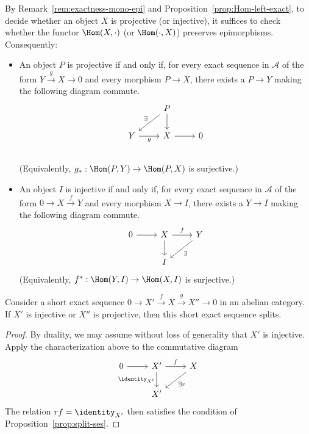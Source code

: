By Remark~\ref{rem:exactness-mono-epi} and
Proposition~\ref{prop:Hom-left-exact}, to decide whether an object $X$ is
projective (or injective), it suffices to check whether the functor
$\Hom(X,\cdot)$ (or $\Hom(\cdot,X)$) preserves epimorphisms. Consequently:
\begin{itemize}
	\item An object $P$ is projective if and only if, for every exact sequence
	in $\mathcal{A}$ of the form $Y\xrightarrow{g}X\to0$ and every morphism
	$P\to X$, there exists a $P\to Y$ making the following diagram commute.
	\[\begin{tikzcd}
		& P \arrow[d] \arrow[ld, "\exists"'] & \\
	Y \arrow[r, "g"'] & X \arrow[r] & 0 \\
	\end{tikzcd}\]
	(Equivalently, $g_*:\Hom(P,Y)\to\Hom(P,X)$ is surjective.)
	\item An object $I$ is injective if and only if, for every exact sequence
	in $\mathcal{A}$ of the form $0\to X\xrightarrow{f}Y$ and every morphism
	$X\to I$, there exists a $Y\to I$ making the following diagram commute.
	\[\begin{tikzcd}
		0 \arrow[r] & X \arrow[r, "f"] \arrow[d] & Y \arrow[ld, "\exists"] \\
		& I &
	\end{tikzcd}\]
	(Equivalently, $f^*:\Hom(Y,I)\to\Hom(X,I)$ is surjective.)
\end{itemize}

\begin{lemma}\label{prop:inj-proj-split}
Consider a short exact sequence
$0\to X'\xrightarrow{f}X\xrightarrow{g}X''\to0$ in an abelian category. If
$X'$ is injective or $X''$ is projective, then this short exact sequence
splits.
\end{lemma}

\begin{proof}
By duality, we may assume without loss of generality that $X'$ is injective.
Apply the characterization above to the commutative diagram
\[\begin{tikzcd}
	0 \arrow[r] & X' \arrow[r, "f"] \arrow[d, "{\identity_{X'}}"'] & X \arrow[ld, "\exists r"] \\
	& X' &
\end{tikzcd}\]
The relation $rf=\identity_{X'}$ then satisfies the condition of
Proposition~\ref{prop:split-ses}.
\end{proof}


